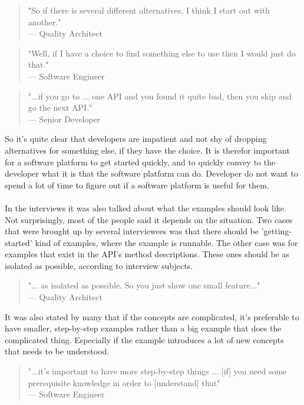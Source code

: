 \documentclass{cslthse-msc}
\begin{document}
    \begin{quote}
        "So if there is several different alternatives, I think I start out with another."\\
        --- Quality Architect
    \end{quote}
    \begin{quote}
        "Well, if I have a choice to find something else to use then I would just do that." \\
        --- Software Engineer
    \end{quote}
    \begin{quote}
        "...if you go to ... one API and you found it quite bad, then you skip and go the next API." \\
        --- Senior Developer
    \end{quote}
    So it's quite clear that developers are impatient and not shy of dropping alternatives for something else, if they have the choice. It is therefor important for a software platform to get started quickly, and to quickly convey to the developer what it is that the software platform can do. Developer do not want to spend a lot of time to figure out if a software platform is useful for them.
    \\ \\
    In the interviews it was also talked about what the examples should look like. Not surprisingly, most of the people said it depends on the situation. Two cases that were brought up by several interviewees was that there should be 'getting-started' kind of examples, where the example is runnable. The other case was for examples that exist in the API's method descriptions. These ones should be as isolated as possible, according to interview subjects.
    \begin{quote}
        "... as isolated as possible. So you just show one small feature..." \\
        --- Quality Architect
    \end{quote}
    It was also stated by many that if the concepts are complicated, it's preferable to have smaller, step-by-step examples rather than a big example that does the complicated thing. Especially if the example introduces a lot of new concepts that needs to be understood.
    \begin{quote}
        "...it's important to have more step-by-step things ... [if] you need some prerequisite knowledge in order to [understand] that" \\
        --- Software Engineer
    \end{quote}
\end{document}
